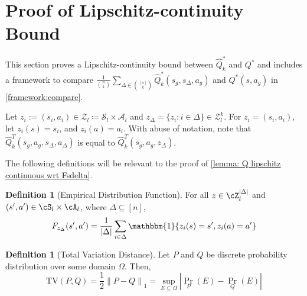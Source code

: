\documentclass{article}
\theoremstyle{plain}
\theoremstyle{definition}
\newtheorem{definition}[theorem]{Definition}
\begin{document}
\section{Proof of Lipschitz-continuity Bound}
\label{proof of lipschitz bound}
This section proves a Lipschitz-continuity bound between $\hat{Q}_k^*$ and $Q^*$ and includes a framework to compare $\frac{1}{{n\choose k}}\sum_{\Delta\in{[n]\choose k}}\hat{Q}^*_k(s_g,s_\Delta,a_g)$ and $Q^*(s,a_g)$ in \cref{framework:compare}. 

Let $z_i:=(s_i, a_i)\in\mathcal{Z}_l\coloneq\mathcal{S}_l\times\mathcal{A}_l$ and $z_\Delta = \{z_i: i\in\Delta\} \in \mathcal{Z}_l^k$. For $z_i = (s_i,a_i)$, let $z_i(s) = s_i$, and $z_i(a) = a_i$. With abuse of notation, note that $\hat{Q}_k^T(s_g,a_g,s_\Delta,a_\Delta)$ is equal to $\hat{Q}_k^T(s_g,a_g,z_\Delta)$. 

The following definitions will be relevant to the proof of \cref{lemma: Q lipschitz continuous wrt Fsdelta}.

\begin{definition}[Empirical Distribution Function] For all $z \in \cZ_l^{|\Delta|}$ and $(s', a') \in \cS_l \times \cA_l$, where $\Delta\subseteq[n]$, 
\[F_{z_\Delta}(s',a') = \frac{1}{|\Delta|}\sum_{i\in\Delta}\mathbbm{1}\{z_i(s) = s', z_i(a) = a'\}\]    
\end{definition}

\begin{definition}[Total Variation Distance]
    Let $P$ and $Q$ be discrete probability distribution over some domain $\Omega$. Then,
    \[\mathrm{TV}(P, Q) = \frac{1}{2}\left\|P-Q\right\|_1 = \sup_{E\subseteq \Omega}\left|\Pr_P(E) - \Pr_Q(E)\right|\]
\end{definition}
\end{document}

